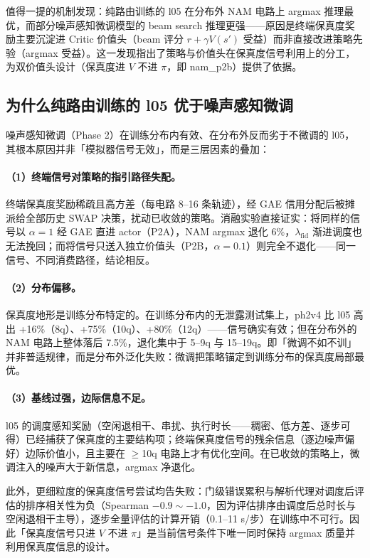 值得一提的机制发现：纯路由训练的 l05 在分布外 NAM 电路上 argmax 推理最优，而部分噪声感知微调模型的 beam search 推理更强——原因是终端保真度奖励主要沉淀进 Critic 价值头（beam 评分 $r + \gamma V(s')$ 受益）而非直接改进策略先验（argmax 受益）。这一发现指出了策略与价值头在保真度信号利用上的分工，为双价值头设计（保真度进 $V$ 不进 $\pi$，即 nam\_p2b）提供了依据。

\subsection{为什么纯路由训练的 l05 优于噪声感知微调}
\label{sec:why-l05}

噪声感知微调（Phase 2）在训练分布内有效、在分布外反而劣于不微调的 l05，其根本原因并非「模拟器信号无效」，而是三层因素的叠加：

\paragraph{（1）终端信号对策略的指引路径失配。} 终端保真度奖励稀疏且高方差（每电路 8--16 条轨迹），经 GAE 信用分配后被摊派给全部历史 SWAP 决策，扰动已收敛的策略。消融实验直接证实：将同样的信号以 $\alpha=1$ 经 GAE 直进 actor（P2A），NAM argmax 退化 6\%，$\lambda_{\text{fid}}$ 渐进调度也无法挽回；而将信号只送入独立价值头（P2B，$\alpha=0.1$）则完全不退化——同一信号、不同消费路径，结论相反。

\paragraph{（2）分布偏移。} 保真度地形是训练分布特定的。在训练分布内的无泄露测试集上，ph2v4 比 l05 高出 +16\%（8q）、+75\%（10q）、+80\%（12q）——信号确实有效；但在分布外的 NAM 电路上整体落后 7.5\%，退化集中于 5--9q 与 15--19q。即「微调不如不训」并非普适规律，而是分布外泛化失败：微调把策略锚定到训练分布的保真度局部最优。

\paragraph{（3）基线过强，边际信息不足。} l05 的调度感知奖励（空闲退相干、串扰、执行时长——稠密、低方差、逐步可得）已经捕获了保真度的主要结构项；终端保真度信号的残余信息（逐边噪声偏好）边际价值小，且主要在 $\geq$10q 电路上才有优化空间。在已收敛的策略上，微调注入的噪声大于新信息，argmax 净退化。

此外，更细粒度的保真度信号尝试均告失败：门级错误累积与解析代理对调度后评估的排序相关性为负（Spearman $-0.9 \sim -1.0$，因为评估排序由调度后总时长与空闲退相干主导），逐步全量评估的计算开销（0.1--11 s/步）在训练中不可行。因此「保真度信号只进 $V$ 不进 $\pi$」是当前信号条件下唯一同时保持 argmax 质量并利用保真度信息的设计。


